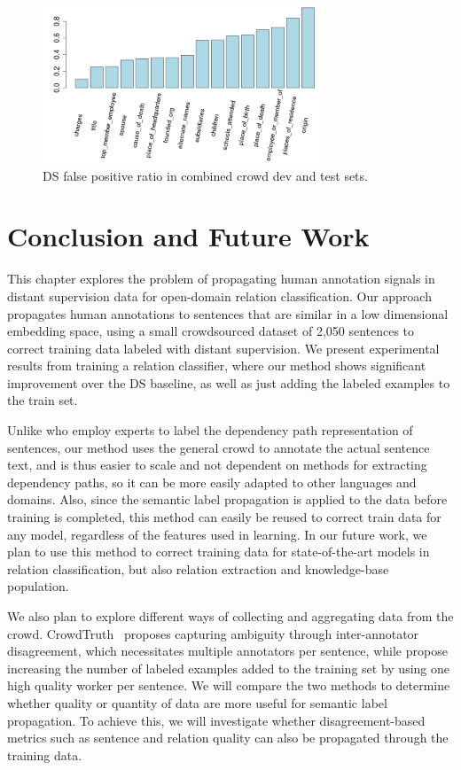 \begin{figure}[tbh!]
\centering
\caption{DS false positive ratio in combined crowd dev and test sets.}
\label{fig:fp}
\includegraphics[width=0.75\textwidth]{img/fp.png}
\end{figure}

\section{Conclusion and Future Work}

This chapter explores the problem of propagating human annotation signals in distant supervision data for open-domain relation classification.  Our approach propagates human annotations to sentences that are similar in a low dimensional embedding space, using a small crowdsourced dataset of 2,050 sentences to correct training data labeled with distant supervision.  We present experimental results from training a relation classifier, where our method shows significant improvement over the DS baseline, as well as just adding the labeled examples to the train set.

Unlike \citet{sterckx2016knowledge} who employ experts to label the dependency path representation of sentences, our method uses the general crowd to annotate the actual sentence text, and is thus easier to scale and not dependent on methods for extracting dependency paths, so it can be more easily adapted to other languages and domains.  Also, since the semantic label propagation is applied to the data before training is completed, this method can easily be reused to correct train data for any model, regardless of the features used in learning.  In our future work, we plan to use this method to correct training data for state-of-the-art models in relation classification, but also relation extraction and knowledge-base population.

We also plan to explore different ways of collecting and aggregating data from the crowd. CrowdTruth~\cite{dumitrache2017false} proposes capturing ambiguity through inter-annotator disagreement, which necessitates multiple annotators per sentence, while \citet{liu2016effective} propose increasing the number of labeled examples added to the training set by using one high quality worker per sentence. We will compare the two methods to determine whether quality or quantity of data are more useful for semantic label propagation. To achieve this, we will investigate whether disagreement-based metrics such as sentence and relation quality can also be propagated through the training data.
